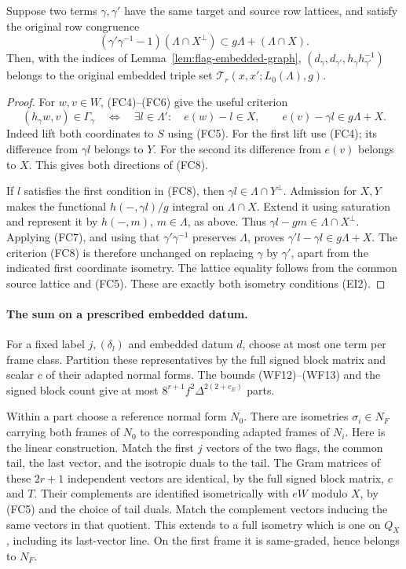 \begin{proposition}
\label{prop:flag-pair-embedded-triple}
Suppose two terms \(\gamma,\gamma'\) have the same target
and source row lattices, and satisfy the original
row congruence
\[
 (\gamma'\gamma^{-1}-1)(\Lambda\cap X^\perp)
       \subset g\Lambda+(\Lambda\cap X).
 \tag{FC7}
\]
Then, with the indices of Lemma~\ref{lem:flag-embedded-graph},
\((d_\gamma,d_{\gamma'},h_\gamma h_{\gamma'}^{-1})\)
belongs to the original embedded triple set
\(\mathcal T_r(x,x';L_0(\Lambda),g)\).
\end{proposition}

\begin{proof}
For \(w,v\in W\), (FC4)--(FC6) give the useful
criterion
\[
 (h_\gamma w,v)\in\Gamma_\gamma
 \quad\Longleftrightarrow\quad
 \exists l\in\Lambda':\quad
 e(w)-l\in X,\qquad e(v)-\gamma l\in g\Lambda+X.
 \tag{FC8}
\]
Indeed lift both coordinates to \(S\) using (FC5).
For the first lift use (FC4); its difference from
\(\gamma l\) belongs to \(Y\).  For the second
its difference from \(e(v)\) belongs to \(X\).
This gives both directions of (FC8).

If \(l\) satisfies the first condition in (FC8), then
\(\gamma l\in\Lambda\cap Y^\perp\).
Admission for \(X,Y\) makes the functional
\(h(-,\gamma l)/g\) integral on \(\Lambda\cap X\).
Extend it using saturation and represent it by
\(h(-,m)\), \(m\in\Lambda\), as above.
Thus \(\gamma l-gm\in\Lambda\cap X^\perp\).
Applying (FC7), and using that \(\gamma'\gamma^{-1}\)
preserves \(\Lambda\), proves
\(\gamma'l-\gamma l\in g\Lambda+X\).
The criterion (FC8) is therefore unchanged on replacing
\(\gamma\) by \(\gamma'\), apart from the indicated first
coordinate isometry.  The lattice equality follows from
the common source lattice and (FC5).
These are exactly both isometry conditions (EI2).
\end{proof}

\paragraph{The sum on a prescribed embedded datum.}
For a fixed label \(j,(\delta_l)\) and embedded datum \(d\),
choose at most one term per frame class.
Partition these representatives by the full signed block
matrix and scalar \(c\) of their adapted normal forms.
The bounds (WF12)--(WF13) and the signed block count
give at most \(8^{r+1}f^2\Delta^{2(2+c_E)}\) parts.

Within a part choose a reference normal form \(N_0\).
There are isometries \(\sigma_i\in N_F\) carrying
both frames of \(N_0\) to the corresponding adapted frames
of \(N_i\).  Here is the linear construction.  Match the
first \(j\) vectors of the two flags, the common tail,
the last vector, and the isotropic duals to the tail.
The Gram matrices of these \(2r+1\) independent vectors
are identical, by the full signed block matrix, \(c\)
and \(T\).  Their complements are identified isometrically
with \(eW\) modulo \(X\), by (FC5) and the choice of tail
duals.  Match the complement vectors inducing the same
vectors in that quotient.  This extends to a full isometry
which is one on \(Q_X\), including its last-vector line.
On the first frame it is same-graded, hence belongs to \(N_F\).

